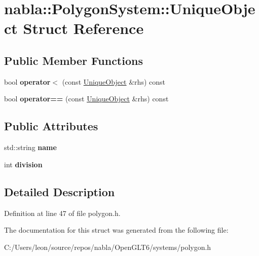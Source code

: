 \hypertarget{structnabla_1_1_polygon_system_1_1_unique_object}{}\section{nabla\+::Polygon\+System\+::Unique\+Object Struct Reference}
\label{structnabla_1_1_polygon_system_1_1_unique_object}
\subsection*{Public Member Functions}
\begin{DoxyCompactItemize}
\item 
\mbox{\label{structnabla_1_1_polygon_system_1_1_unique_object_ac55466d83cac221d1242021d27eca75d}} 
bool {\bfseries operator$<$} (const \mbox{\hyperlink{structnabla_1_1_polygon_system_1_1_unique_object}{Unique\+Object}} \&rhs) const
\item 
\mbox{\label{structnabla_1_1_polygon_system_1_1_unique_object_a62379faa71d83b8ca4bf624a4f46755a}} 
bool {\bfseries operator==} (const \mbox{\hyperlink{structnabla_1_1_polygon_system_1_1_unique_object}{Unique\+Object}} \&rhs) const
\end{DoxyCompactItemize}
\subsection*{Public Attributes}
\begin{DoxyCompactItemize}
\item 
\mbox{\label{structnabla_1_1_polygon_system_1_1_unique_object_a3d51efac3bb7dc50e68783fe1653bbaf}} 
std\+::string {\bfseries name}
\item 
\mbox{\label{structnabla_1_1_polygon_system_1_1_unique_object_a11799d9fcecd293ec9f2c3b0b2213b3f}} 
int {\bfseries division}
\end{DoxyCompactItemize}


\subsection{Detailed Description}


Definition at line 47 of file polygon.\+h.



The documentation for this struct was generated from the following file\+:\begin{DoxyCompactItemize}
\item 
C\+:/\+Users/leon/source/repos/nabla/\+Open\+G\+L\+T6/systems/polygon.\+h\end{DoxyCompactItemize}
